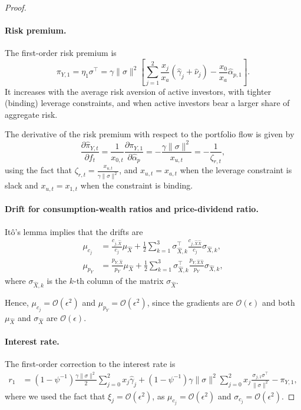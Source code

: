 \begin{proof}
\paragraph{Risk premium.}
The first-order risk premium is
\begin{equation}
    \pi_{Y,1} = \eta_1 \sigma^\top = \gamma \|\sigma\|^2 \left[\sum_{j=1}^2 \frac{x_j}{x_a}(\hat{\gamma}_j+ \hat{\nu}_{j}) -\frac{x_0}{x_a}\hat{\alpha}_{p,1} \right].
\end{equation}
It increases with the average risk aversion of active investors, with tighter (binding) leverage constraints, and when active investors bear a larger share of aggregate risk.

The derivative of the risk premium with respect to the portfolio flow is given by
\begin{equation}
    \frac{\partial \hat{\pi}_{Y,t}}{\partial f_t} = \frac{1}{x_{0,t}} \frac{\partial \pi_{Y,1}}{\partial \hat{\alpha}_p} = - \frac{\gamma \|\sigma\|^2}{x_{u,t}} = -\frac{1}{\zeta_{r,t}},
\end{equation}
using the fact that $\zeta_{r,t} = \frac{x_{u,t}}{\gamma \|\sigma\|^2}$, and $x_{u,t} = x_{a,t}$ when the leverage constraint is slack and $x_{u,t} = x_{1,t}$ when the constraint is binding.

\paragraph{Drift for consumption-wealth ratios and price-dividend ratio.}
It\^o's lemma implies that the drifts are
\begin{align}
    \mu_{c_j} &= \frac{c_{j,\hat{X}}}{c_j} \mu_{\hat{X}} + \frac{1}{2}\sum_{k=1}^3 \sigma_{\hat{X},k}^\top \frac{c_{j,\hat{X} \hat{X}}}{c_j} \sigma_{\hat{X},k}, \\
    \mu_{p_Y} &= \frac{p_{Y,\hat{X}}}{p_Y} \mu_{\hat{X}} + \frac{1}{2}\sum_{k=1}^3 \sigma_{\hat{X},k}^\top \frac{p_{Y,\hat{X} \hat{X}}}{p_Y} \sigma_{\hat{X},k},
\end{align}
where $\sigma_{\hat{X},k}$ is the $k$-th column of the matrix $\sigma_{\hat{X}}$.

Hence, $\mu_{c_j} = \mathcal{O}(\epsilon^2)$ and $\mu_{p_Y} = \mathcal{O}(\epsilon^2)$, since the gradients are $\mathcal{O}(\epsilon)$ and both $\mu_{\hat{X}}$ and $\sigma_{\hat{X}}$ are $\mathcal{O}(\epsilon)$.


\paragraph{Interest rate.}
The first-order correction to the interest rate is
\begin{align}
    r_1 &= (1-\psi^{-1}) \frac{\gamma  \|\sigma\|^2}{2}\sum_{j=0}^2 x_{j} \hat{\gamma}_j 
    + (1-\psi^{-1}) \gamma \|\sigma\|^2 \sum_{j=0}^2 x_j \frac{\sigma_{j,1}\sigma^\top}{\|\sigma\|^2}
    - \pi_{Y,1},
\end{align}
where we used the fact that $\xi_j = \mathcal{O}(\epsilon^2)$, as $\mu_{c_j} = \mathcal{O}(\epsilon^2)$ and $\sigma_{c_j} = \mathcal{O}(\epsilon^2)$.


\end{proof}
